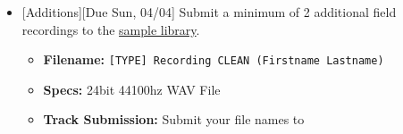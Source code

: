 \def\dMon{Mon, 03/29}
\def\dTues{Tues, 03/30}
\def\dWed{Wed, 03/31}
\def\dThur{Thur, 04/01}
\def\dFri{Fri, 04/02}
\def\dSat{Sat, 04/03}
\def\dSun{Sun, 04/04}
\placeDate

\begin{itemize}[noitemsep,topsep=0pt,leftmargin=*]
\item {}[Additions][Due \dSun] \newline 
 Submit a minimum of 2 additional field recordings to the \href{\#}{sample library}.
\begin{itemize}
	\item \textbf{Filename:} \texttt{[TYPE] Recording CLEAN (Firstname Lastname)}
	\item \textbf{Specs:} 24bit 44100hz WAV File
	\item \textbf{Track Submission:} Submit your file names to \discordS
\end{itemize}
\end{itemize}